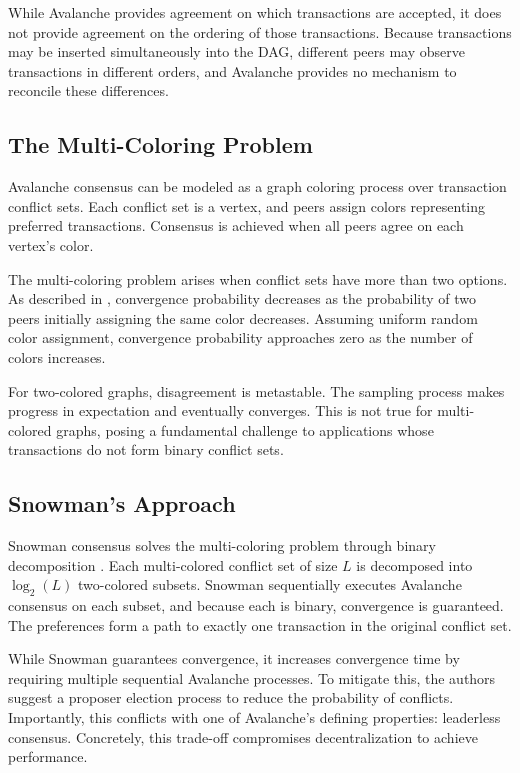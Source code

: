 \documentclass[12pt]{article}
\begin{document}
While Avalanche provides agreement on which transactions are accepted, it does
not provide agreement on the ordering of those transactions. Because
transactions may be inserted simultaneously into the DAG, different peers may
observe transactions in different orders, and Avalanche provides no mechanism
to reconcile these differences.

\subsection{The Multi-Coloring Problem}
\label{sec:multicolor}
Avalanche consensus can be modeled as a graph coloring process over transaction
conflict sets. Each conflict set is a vertex, and peers assign colors
representing preferred transactions. Consensus is achieved when all peers agree
on each vertex's color.

The multi-coloring problem arises when conflict sets have more than two
options. As described in \cite{buchwald2024frosty}, convergence probability
decreases as the probability of two peers initially assigning the same color
decreases. Assuming uniform random color assignment, convergence probability
approaches zero as the number of colors increases.

For two-colored graphs, disagreement is metastable. The sampling process makes
progress in expectation and eventually converges. This is not true for
multi-colored graphs, posing a fundamental challenge to applications whose
transactions do not form binary conflict sets.

\subsection{Snowman's Approach}
Snowman consensus solves the multi-coloring problem through binary
decomposition \cite{buchwald2024frosty}. Each multi-colored conflict set of
size $L$ is decomposed into $\log_2(L)$ two-colored subsets. Snowman
sequentially executes Avalanche consensus on each subset, and because each is
binary, convergence is guaranteed. The preferences form a path to exactly one
transaction in the original conflict set.

While Snowman guarantees convergence, it increases convergence time by requiring
multiple sequential Avalanche processes. To mitigate this, the authors suggest
a proposer election process to reduce the probability of conflicts.
Importantly, this conflicts with one of Avalanche's defining properties:
leaderless consensus. Concretely, this trade-off compromises decentralization to
achieve performance.
\end{document}
